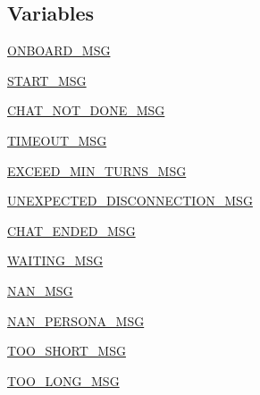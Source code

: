 \subsection*{Variables}
\begin{DoxyCompactItemize}
\item 
\hyperlink{namespaceparlai_1_1mturk_1_1tasks_1_1convai2__model__eval_1_1worlds_ad0a08e327f9fda1fbe378664995026ca}{O\+N\+B\+O\+A\+R\+D\+\_\+\+M\+SG}
\item 
\hyperlink{namespaceparlai_1_1mturk_1_1tasks_1_1convai2__model__eval_1_1worlds_ad5503aec151cd110dfc95f7cbb6c2041}{S\+T\+A\+R\+T\+\_\+\+M\+SG}
\item 
\hyperlink{namespaceparlai_1_1mturk_1_1tasks_1_1convai2__model__eval_1_1worlds_a36c19dd044758e1b7f73bbd1b7e767dc}{C\+H\+A\+T\+\_\+\+N\+O\+T\+\_\+\+D\+O\+N\+E\+\_\+\+M\+SG}
\item 
\hyperlink{namespaceparlai_1_1mturk_1_1tasks_1_1convai2__model__eval_1_1worlds_a8ddc8706f77c75a1776a9bc29d741d94}{T\+I\+M\+E\+O\+U\+T\+\_\+\+M\+SG}
\item 
\hyperlink{namespaceparlai_1_1mturk_1_1tasks_1_1convai2__model__eval_1_1worlds_ae310b9ba5cbd1575217e5e4ca45c8b5f}{E\+X\+C\+E\+E\+D\+\_\+\+M\+I\+N\+\_\+\+T\+U\+R\+N\+S\+\_\+\+M\+SG}
\item 
\hyperlink{namespaceparlai_1_1mturk_1_1tasks_1_1convai2__model__eval_1_1worlds_a167a85c02cddd69b632e02a8f2b56601}{U\+N\+E\+X\+P\+E\+C\+T\+E\+D\+\_\+\+D\+I\+S\+C\+O\+N\+N\+E\+C\+T\+I\+O\+N\+\_\+\+M\+SG}
\item 
\hyperlink{namespaceparlai_1_1mturk_1_1tasks_1_1convai2__model__eval_1_1worlds_ac6a75c248016f16e6cd84fe48ad09dd9}{C\+H\+A\+T\+\_\+\+E\+N\+D\+E\+D\+\_\+\+M\+SG}
\item 
\hyperlink{namespaceparlai_1_1mturk_1_1tasks_1_1convai2__model__eval_1_1worlds_aec49d063e0f2c1c3086fecdf9184405f}{W\+A\+I\+T\+I\+N\+G\+\_\+\+M\+SG}
\item 
\hyperlink{namespaceparlai_1_1mturk_1_1tasks_1_1convai2__model__eval_1_1worlds_abdc0ceba74c2ffba8575d99b44da71f7}{N\+A\+N\+\_\+\+M\+SG}
\item 
\hyperlink{namespaceparlai_1_1mturk_1_1tasks_1_1convai2__model__eval_1_1worlds_a66cc0e8619113048a97d95a374e7ac6d}{N\+A\+N\+\_\+\+P\+E\+R\+S\+O\+N\+A\+\_\+\+M\+SG}
\item 
\hyperlink{namespaceparlai_1_1mturk_1_1tasks_1_1convai2__model__eval_1_1worlds_a8a10324ea6c5e0098c09253bb90901e5}{T\+O\+O\+\_\+\+S\+H\+O\+R\+T\+\_\+\+M\+SG}
\item 
\hyperlink{namespaceparlai_1_1mturk_1_1tasks_1_1convai2__model__eval_1_1worlds_a627acf441abcab3ce5012ac4ad584e32}{T\+O\+O\+\_\+\+L\+O\+N\+G\+\_\+\+M\+SG}

\end{DoxyCompactItemize}
